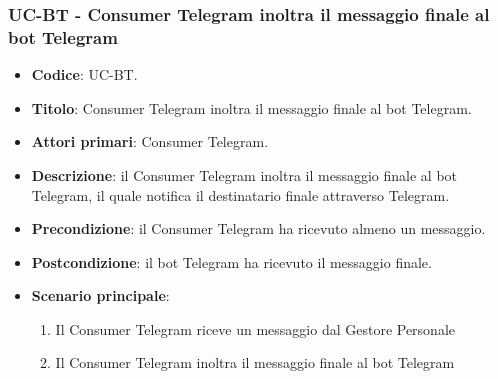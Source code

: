 \subsubsection{UC\theuccount-BT - Consumer Telegram inoltra il messaggio finale al bot Telegram}
	\begin{itemize}
		\item \textbf{Codice}: UC\theuccount-BT.
		\item \textbf{Titolo}: Consumer Telegram inoltra il messaggio finale al bot Telegram.
		\item \textbf{Attori primari}: Consumer Telegram.
		\item \textbf{Descrizione}: il Consumer Telegram inoltra il messaggio finale al bot Telegram, il quale notifica il destinatario finale attraverso Telegram.
		\item \textbf{Precondizione}: il Consumer Telegram ha ricevuto almeno un messaggio.
		\item \textbf{Postcondizione}: il bot Telegram ha ricevuto il messaggio finale.
		\item \textbf{Scenario principale}: 
		\begin{enumerate}
			\item Il Consumer Telegram riceve un messaggio dal Gestore Personale
			\item Il Consumer Telegram inoltra il messaggio finale al bot Telegram
		\end{enumerate}
		
	\end{itemize}